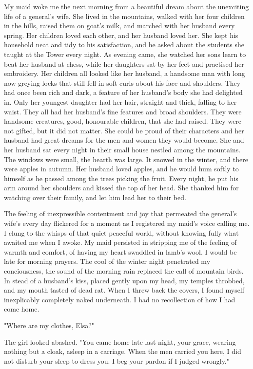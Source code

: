 \documentclass{article}
\begin{document}
My maid woke me the next morning from a beautiful dream about the unexciting life of a general's wife. She lived in the mountains, walked with her four children in the hills, raised them on goat's milk, and marched with her husband every spring. Her children loved each other, and her husband loved her. She kept his household neat and tidy to his satisfaction, and he asked about the students she taught at the Tower every night. As evening came, she watched her sons learn to beat her husband at chess, while her daughters sat by her feet and practised her embroidery. Her children all looked like her husband, a handsome man with long now greying locks that still fell in soft curls about his face and shoulders. They had once been rich and dark, a feature of her husband's body she had delighted in. Only her youngest daughter had her hair, straight and thick, falling to her waist. They all had her husband's fine features and broad shoulders. They were handsome creatures, good, honourable children, that she had raised. They were not gifted, but it did not matter.  She could be proud of their characters and her husband had great dreams for the men and women they would become. She and her husband sat every night in their small house nestled among the mountains. The windows were small, the hearth was large. It snowed in the winter, and there were apples in autumn. Her husband loved apples, and he would hum softly to himself as he passed among the trees picking the fruit. Every night, he put his arm around her shoulders and kissed the top of her head. She thanked him for watching over their family, and let him lead her to their bed.

The feeling of inexpressible contentment and joy that permeated the general's wife's every day flickered for a moment as I registered my maid's voice calling me. I clung to the whisps of that quiet peaceful world, without knowing fully what awaited me when I awoke. My maid persisted in stripping me of the feeling of warmth and comfort, of having my heart swaddled in lamb's wool. I would be late for morning prayers. The cool of the winter night penetrated my conciousness, the sound of the morning rain replaced the call of mountain birds. In stead of a husband's kiss, placed gently upon my head, my temples throbbed, and my mouth tasted of dead rat. When I threw back the covers, I found myself inexplicably completely naked underneath. I had no recollection of how I had come home.

"Where are my clothes, Elsa?"

The girl looked abashed. "You came home late last night, your grace, wearing nothing but a cloak, asleep in a carriage. When the men carried you here, I did not disturb your sleep to dress you. I beg your pardon if I judged wrongly."
\end{document}

